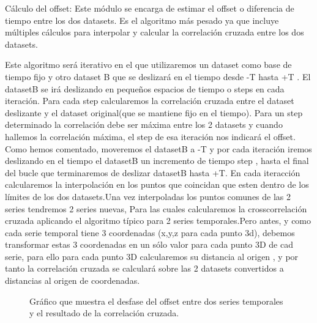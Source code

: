 Cálculo del offset:
Este módulo se encarga de estimar el offset o diferencia de tiempo entre los dos datasets. Es el algoritmo más pesado ya que incluye múltiples cálculos para interpolar y calcular 
la correlación cruzada entre los dos datasets.

Este algoritmo será iterativo en el que utilizaremos un dataset como base de tiempo fijo y otro dataset B que se deslizará en el tiempo desde -T hasta +T . El datasetB se irá 
deslizando en pequeños espacios de tiempo o steps en cada iteración. Para cada step calcularemos la correlación cruzada entre el dataset deslizante y el dataset original(que se 
mantiene fijo en el tiempo). Para un step determinado la correlación debe ser máxima entre los 2 datasets y cuando hallemos la correlación máxima, el step de esa iteración nos 
indicará el offset. Como hemos comentado, moveremos el datasetB a -T y por cada iteración iremos deslizando en el tiempo el datasetB un incremento de tiempo step , hasta el final 
del bucle que terminaremos de deslizar datasetB hasta +T. En cada iteracción calcularemos la interpolación en los puntos que coincidan que esten dentro de los límites de los dos 
datasets.Una vez interpoladas los puntos comunes de las 2 series tendremos 2 series nuevas, Para las cuales calcularemos la crosscorrelación cruzada aplicando el algoritmo típico 
para 2 series temporales.Pero antes, y como cada serie temporal tiene 3 coordenadas (x,y,z para cada punto 3d), debemos transformar estas 3 coordenadas en un sólo valor para cada 
punto 3D de cad serie, para ello para cada punto 3D calcularemos su distancia al origen , y por tanto la correlación cruzada se calculará sobre las 2 datasets convertidos a 
distancias al origen de coordenadas.

\begin{figure}[H]
\begin{center}
\hspace{0.5cm}

\end{center}

\caption{Gráfico que muestra el desfase del offset entre dos series temporales y el resultado de la correlación cruzada.}
\end{figure}

